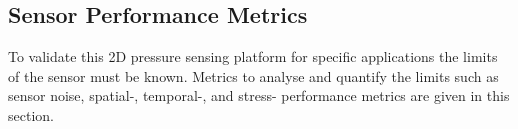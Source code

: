 \subsection{Sensor Performance Metrics}\label{sec:Sensor Performance Metrics2}
To validate this 2D pressure sensing platform for specific applications the limits of the sensor must be known. Metrics to analyse and quantify the limits such as sensor noise, spatial-, temporal-, and stress- performance metrics are given in this section.


